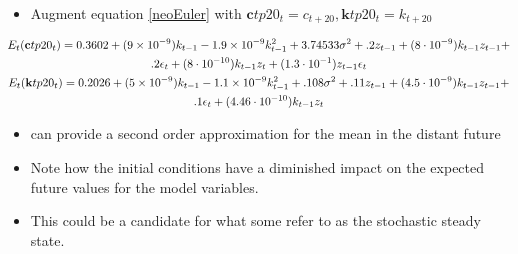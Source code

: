 \documentclass{beamer}
\begin{document}
 {
  \begin{itemize}
   \item Augment equation \ref{neoEuler} with $\mathbf{c}tp20_t = c_{t+20}, \mathbf{k}tp20_t = k_{t+20}$
    \end{itemize}
{\tiny
 \begin{gather*} 
E_t(     \mathbf{c}tp20_t)= 0.3602 + (9 \times  10^{-9}) k_{t-1} -1.9 \times 10^{-9} k_{t-1}^2 + 3.74533 \sigma^2 + .2 z_{t-1} +(8 \cdot 10^{-9}) k_{t-1} z_{t-1} +\\
 .2 \epsilon_t  +(8 \cdot 10^{-10}) k_{t-1} z_t + (1.3 \cdot 10^{-1}) z_{t-1} \epsilon_t\\
E_t(       \mathbf{k}tp20_t) = 0.2026 + (5 \times  10^{-9}) k_{t-1} -1.1 \times 10^{-9} k_{t-1}^2 + .108 \sigma^2 + .11 z_{t-1} +(4.5 \cdot 10^{-9}) k_{t-1} z_{t-1} +\\
 .1 \epsilon_t  +(4.46 \cdot 10^{-10}) k_{t-1} z_t 
 \end{gather*}
}
    \begin{itemize}
  \item can provide a second order approximation for the
mean in the distant future
 \item Note how the initial conditions have a diminished 
 impact on the expected future
 values for the model variables.
\item This could be a candidate for what
some refer to as the stochastic steady state.


   \end{itemize}
 }




\end{document}
